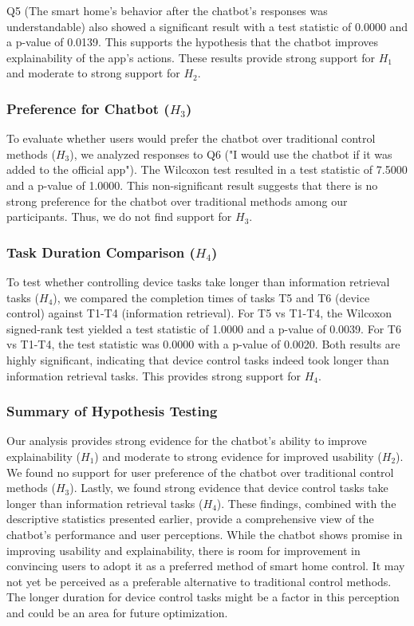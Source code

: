 Q5 (The smart home's behavior after the chatbot's responses was understandable) also showed a significant result with a test statistic of 0.0000 and a p-value of 0.0139. This supports the hypothesis that the chatbot improves explainability of the app's actions.
These results provide strong support for \(H_1\) and moderate to strong support for \(H_2\).
\subsubsection{Preference for Chatbot (\(H_3\))}
To evaluate whether users would prefer the chatbot over traditional control methods (\(H_3\)), we analyzed responses to Q6 ("I would use the chatbot if it was added to the official app"). The Wilcoxon test resulted in a test statistic of 7.5000 and a p-value of 1.0000. This non-significant result suggests that there is no strong preference for the chatbot over traditional methods among our participants. Thus, we do not find support for \(H_3\).
\subsubsection{Task Duration Comparison (\(H_4\))}
To test whether controlling device tasks take longer than information retrieval tasks (\(H_4\)), we compared the completion times of tasks T5 and T6 (device control) against T1-T4 (information retrieval).
For T5 vs T1-T4, the Wilcoxon signed-rank test yielded a test statistic of 1.0000 and a p-value of 0.0039. For T6 vs T1-T4, the test statistic was 0.0000 with a p-value of 0.0020. Both results are highly significant, indicating that device control tasks indeed took longer than information retrieval tasks. This provides strong support for \(H_4\).
\subsubsection{Summary of Hypothesis Testing}
Our analysis provides strong evidence for the chatbot's ability to improve explainability (\(H_1\)) and moderate to strong evidence for improved usability (\(H_2\)). We found no support for user preference of the chatbot over traditional control methods (\(H_3\)). Lastly, we found strong evidence that device control tasks take longer than information retrieval tasks (\(H_4\)).
These findings, combined with the descriptive statistics presented earlier, provide a comprehensive view of the chatbot's performance and user perceptions. While the chatbot shows promise in improving usability and explainability, there is room for improvement in convincing users to adopt it as a preferred method of smart home control. It may not yet be perceived as a preferable alternative to traditional control methods. The longer duration for device control tasks might be a factor in this perception and could be an area for future optimization.


